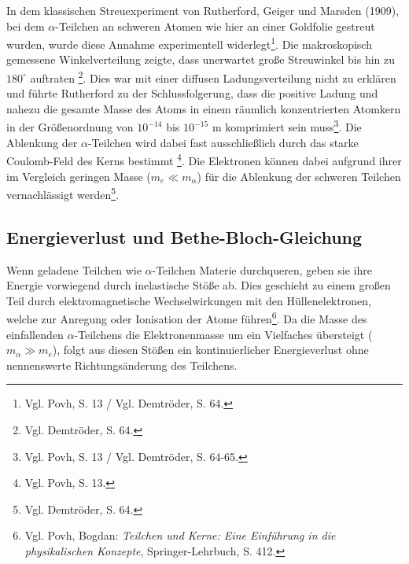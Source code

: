 In dem klassischen Streuexperiment von Rutherford, Geiger und Marsden (1909), bei dem $\alpha$-Teilchen an schweren Atomen wie hier an einer Goldfolie gestreut wurden, wurde diese Annahme experimentell widerlegt\footnote{Vgl. Povh, S. 13 / Vgl. Demtröder, S. 64.}. Die makroskopisch gemessene Winkelverteilung zeigte, dass unerwartet große Streuwinkel bis hin zu $180^\circ$ auftraten \footnote{Vgl. Demtröder, S. 64.}. Dies war mit einer diffusen Ladungsverteilung nicht zu erklären und führte Rutherford zu der Schlussfolgerung, dass die positive Ladung und nahezu die gesamte Masse des Atoms in einem räumlich konzentrierten Atomkern in der Größenordnung von $10^{-14}$ bis $10^{-15}\text{ m}$ komprimiert sein muss\footnote{Vgl. Povh, S. 13 / Vgl. Demtröder, S. 64-65.}. Die Ablenkung der $\alpha$-Teilchen wird dabei fast ausschließlich durch das starke Coulomb-Feld des Kerns bestimmt \footnote{Vgl. Povh, S. 13.}. Die Elektronen können dabei aufgrund ihrer im Vergleich geringen Masse ($m_e \ll m_\alpha$) für die Ablenkung der schweren Teilchen vernachlässigt werden\footnote{Vgl. Demtröder, S. 64.}.

\subsection{Energieverlust und Bethe-Bloch-Gleichung}
\label{subsec:energieverlust}
Wenn geladene Teilchen wie $\alpha$-Teilchen Materie durchqueren, geben sie ihre Energie vorwiegend durch inelastische Stöße ab. Dies geschieht zu einem großen Teil durch elektromagnetische Wechselwirkungen mit den Hüllenelektronen, welche zur Anregung oder Ionisation der Atome führen\footnote{Vgl. Povh, Bogdan: \textit{Teilchen und Kerne: Eine Einführung in die physikalischen Konzepte}, Springer-Lehrbuch, S. 412.}. Da die Masse des einfallenden $\alpha$-Teilchens die Elektronenmasse um ein Vielfaches übersteigt ($m_\alpha \gg m_e$), folgt aus diesen Stößen ein kontinuierlicher Energieverlust ohne nennenswerte Richtungsänderung des Teilchens.

